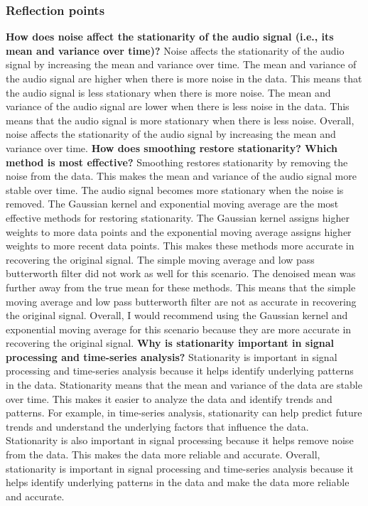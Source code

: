 \documentclass[a4paper,12pt]{article} %
\begin{document}
\subsubsection{Reflection points}
\textbf{How does noise affect the stationarity of the audio signal (i.e., its mean and variance
over time)?}
Noise affects the stationarity of the audio signal by increasing the mean and variance over time. The mean and variance of the audio signal are higher when there is more noise in the data. This means that the audio signal is less stationary when there is more noise. The mean and variance of the audio signal are lower when there is less noise in the data. This means that the audio signal is more stationary when there is less noise. Overall, noise affects the stationarity of the audio signal by increasing the mean and variance over time.
\newline\newline
\textbf{How does smoothing restore stationarity? Which method is most effective?}
Smoothing restores stationarity by removing the noise from the data. This makes the mean and variance of the audio signal more stable over time. The audio signal becomes more stationary when the noise is removed. The Gaussian kernel and exponential moving average are the most effective methods for restoring stationarity. The Gaussian kernel assigns higher weights to more data points and the exponential moving average assigns higher weights to more recent data points. This makes these methods more accurate in recovering the original signal. The simple moving average and low pass butterworth filter did not work as well for this scenario. The denoised mean was further away from the true mean for these methods. This means that the simple moving average and low pass butterworth filter are not as accurate in recovering the original signal. Overall, I would recommend using the Gaussian kernel and exponential moving average for this scenario because they are more accurate in recovering the original signal.
\newline\newline
\textbf{Why is stationarity important in signal processing and time-series analysis?}
Stationarity is important in signal processing and time-series analysis because it helps identify underlying patterns in the data. Stationarity means that the mean and variance of the data are stable over time. This makes it easier to analyze the data and identify trends and patterns. For example, in time-series analysis, stationarity can help predict future trends and understand the underlying factors that influence the data. Stationarity is also important in signal processing because it helps remove noise from the data. This makes the data more reliable and accurate. Overall, stationarity is important in signal processing and time-series analysis because it helps identify underlying patterns in the data and make the data more reliable and accurate.
\end{document}
